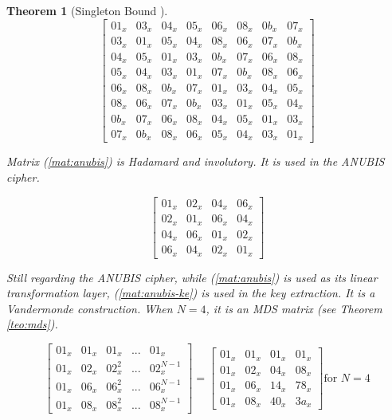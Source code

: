 \documentclass{report}
\newtheorem{theorem}{Theorem}{\bfseries}{\itshape}
\begin{document}
\begin{theorem}[Singleton Bound \cite{SloaneBook}]
\begin{equation}\label{mat:khazad}
\begin{bmatrix}
01_x & 03_x & 04_x & 05_x & 06_x & 08_x & 0b_x & 07_x\\
03_x & 01_x & 05_x & 04_x & 08_x & 06_x & 07_x & 0b_x\\
04_x & 05_x & 01_x & 03_x & 0b_x & 07_x & 06_x & 08_x\\
05_x & 04_x & 03_x & 01_x & 07_x & 0b_x & 08_x & 06_x\\
06_x & 08_x & 0b_x & 07_x & 01_x & 03_x & 04_x & 05_x\\
08_x & 06_x & 07_x & 0b_x & 03_x & 01_x & 05_x & 04_x\\
0b_x & 07_x & 06_x & 08_x & 04_x & 05_x & 01_x & 03_x\\
07_x & 0b_x & 08_x & 06_x & 05_x & 04_x & 03_x & 01_x
\end{bmatrix}
\end{equation}

Matrix (\ref{mat:anubis}) is Hadamard and involutory. It is used in the ANUBIS \cite{ANUBIS2000} cipher.

\begin{equation}\label{mat:anubis}
\begin{bmatrix}
01_x & 02_x & 04_x & 06_x\\
02_x & 01_x & 06_x & 04_x\\
04_x & 06_x & 01_x & 02_x\\
06_x & 04_x & 02_x & 01_x
\end{bmatrix}
\end{equation}

Still regarding the ANUBIS cipher, while (\ref{mat:anubis}) is used as its linear transformation layer, (\ref{mat:anubis-ke}) is used in the key extraction. It is a Vandermonde construction. When $N = 4$, it is an MDS matrix (see Theorem \ref{teo:mds}).

\begin{equation}\label{mat:anubis-ke}
\begin{bmatrix}
01_x & 01_x & 01_x & ... & 01_x\\
01_x & 02_x & 02_x^2 & ... & 02_x^{N-1}\\
01_x & 06_x & 06_x^2 & ... & 06_x^{N-1}\\
01_x & 08_x & 08_x^2 & ... & 08_x^{N-1}
\end{bmatrix}
=
\begin{bmatrix}
01_x & 01_x & 01_x & 01_x\\
01_x & 02_x & 04_x & 08_x\\
01_x & 06_x & 14_x & 78_x\\
01_x & 08_x & 40_x & 3a_x
\end{bmatrix} \text{for } N=4
\end{equation}


\end{theorem}
\end{document}
